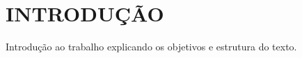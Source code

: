 \chapter{INTRODUÇÃO}
\thispagestyle{empty}

Introdução ao trabalho explicando os objetivos e estrutura do texto.